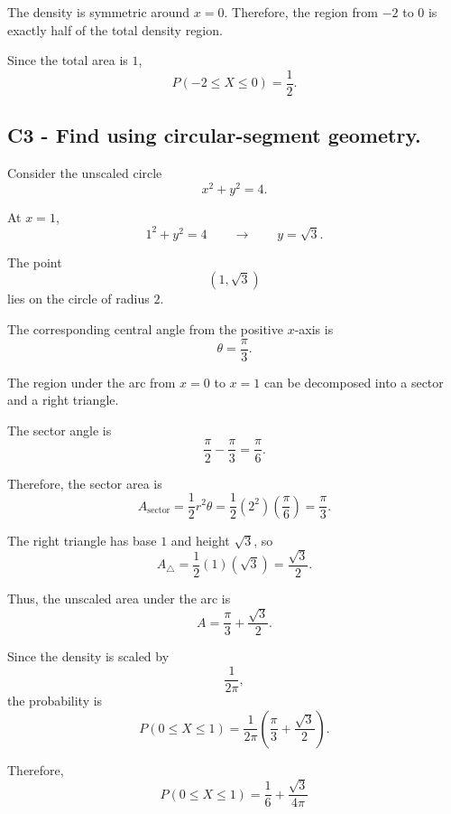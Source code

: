 {	The density is symmetric around $x=0$. Therefore, the region from $-2$ to $0$ is exactly half of the total density region.
	
	Since the total area is $1$,
	\[
	P(-2\le X\le0)=\frac{1}{2}.
	\]
	

	\label{subsec:semicircular-density-model-c3-c}
	\subsection*{C3 - Find  using circular-segment geometry. }
	
	Consider the unscaled circle
	\[
	x^2+y^2=4.
	\]
	
	At $x=1$,
	\[
	1^2+y^2=4
	\qquad \longrightarrow \qquad
	y=\sqrt{3}.
	\]
	
	The point
	\[
	(1,\sqrt{3})
	\]
	lies on the circle of radius $2$.
	
	The corresponding central angle from the positive $x$-axis is
	\[
	\theta=\frac{\pi}{3}.
	\]
	
	The region under the arc from $x=0$ to $x=1$ can be decomposed into a sector and a right triangle.
	
	The sector angle is
	\[
	\frac{\pi}{2}-\frac{\pi}{3}
	=\frac{\pi}{6}.
	\]
	
	Therefore, the sector area is
	\[
	A_{\text{sector}}
	=\frac{1}{2}r^2\theta
	=\frac{1}{2}(2^2)\left(\frac{\pi}{6}\right)
	=\frac{\pi}{3}.
	\]
	
	The right triangle has base $1$ and height $\sqrt{3}$, so
	\[
	A_{\triangle}
	=\frac{1}{2}(1)(\sqrt{3})
	=\frac{\sqrt{3}}{2}.
	\]
	
	Thus, the unscaled area under the arc is
	\[
	A=\frac{\pi}{3}+\frac{\sqrt{3}}{2}.
	\]
	
	Since the density is scaled by
	\[
	\frac{1}{2\pi},
	\]
	the probability is
	\[
	P(0\le X\le1)
	=
	\frac{1}{2\pi}
	\left(
	\frac{\pi}{3}+\frac{\sqrt{3}}{2}
	\right).
	\]
	
	Therefore,
	\[
	\boxed{
		P(0\le X\le1)
		=
		\frac{1}{6}+\frac{\sqrt{3}}{4\pi}
	}
	\]
	

	}

